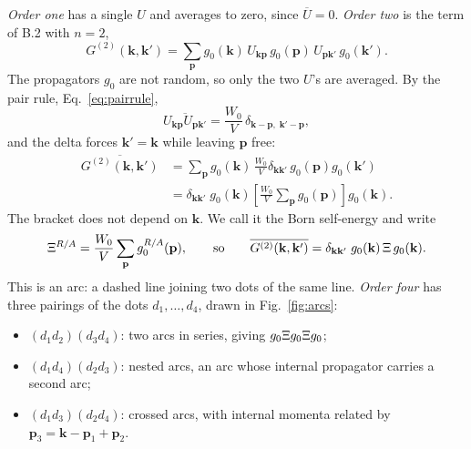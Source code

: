 \emph{Order one} has a single $U$ and averages to zero, since
$\overline U=0$. \emph{Order two} is the term of B.2 with $n=2$,
\[
G^{(2)}(\mathbf k,\mathbf k')
=\sum_{\mathbf p}
g_0(\mathbf k)\,U_{\mathbf k\mathbf p}\,
g_0(\mathbf p)\,U_{\mathbf p\mathbf k'}\,
g_0(\mathbf k').
\]
The propagators $g_0$ are not random, so only the two $U$'s are
averaged. By the pair rule, Eq.~\eqref{eq:pairrule},
\[
\overline{U_{\mathbf k\mathbf p}U_{\mathbf p\mathbf k'}}
=\frac{W_0}{V}\,
\delta_{\mathbf k-\mathbf p,\;\mathbf k'-\mathbf p},
\]
and the delta forces $\mathbf k'=\mathbf k$ while leaving
$\mathbf p$ free:
\[
\begin{aligned}
\overline{G^{(2)}(\mathbf k,\mathbf k')}
&=\sum_{\mathbf p}g_0(\mathbf k)\,
\frac{W_0}{V}\delta_{\mathbf k\mathbf k'}\,
g_0(\mathbf p)g_0(\mathbf k')\\
&=\delta_{\mathbf k\mathbf k'}\;
g_0(\mathbf k)
\left[\frac{W_0}{V}\sum_{\mathbf p}g_0(\mathbf p)\right]
g_0(\mathbf k).
\end{aligned}
\]
The bracket does not depend on $\mathbf k$. We call it the Born
self-energy and write
\[
\Xi^{R/A}=\frac{W_0}{V}\sum_{\mathbf p}g_0^{R/A}(\mathbf p),
\qquad\text{so}\qquad
\overline{G^{(2)}(\mathbf k,\mathbf k')}
=\delta_{\mathbf k\mathbf k'}\;
g_0(\mathbf k)\,\Xi\,g_0(\mathbf k).
\]
This is an arc: a dashed line joining two dots of the same line.
\emph{Order four} has three pairings of the dots
$d_1,\dots,d_4$, drawn in Fig.~\ref{fig:arcs}:
\begin{itemize}
 \item $(d_1d_2)(d_3d_4)$: two arcs in series, giving
 $g_0\Xi g_0\Xi g_0$;
 \item $(d_1d_4)(d_2d_3)$: nested arcs, an arc whose internal
 propagator carries a second arc;
 \item $(d_1d_3)(d_2d_4)$: crossed arcs, with internal momenta
 related by
 $\mathbf p_3=\mathbf k-\mathbf p_1+\mathbf p_2$.
\end{itemize}

